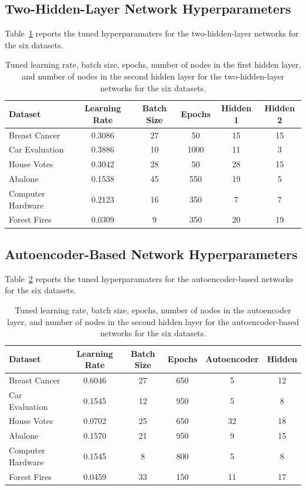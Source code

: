 \documentclass[twoside,11pt]{article}
\begin{document}
\subsection{Two-Hidden-Layer Network Hyperparameters}
Table~\ref{tab:hidden-tuning} reports the tuned hyperparamaters for the two-hidden-layer networks for the six datasets.

\begin{table}[h]
    \centering
    \begin{tabular}{lccccc}
    \hline
    Dataset & Learning Rate & Batch Size & Epochs & Hidden 1 & Hidden 2 \\
    \hline
    Breast Cancer      & 0.3086    & 27   & 50  & 15    & 15 \\
    Car Evaluation     & 0.3886   & 10 & 1000    & 11   & 3 \\
    House Votes        & 0.3042    & 28    & 50     & 28    & 15 \\
    Abalone            & 0.1538  & 45 & 550     & 19    & 5 \\
    Computer Hardware  & 0.2123   & 16  & 350   & 7     & 7 \\
    Forest Fires       & 0.0309   & 9  & 350    & 20    & 19 \\
    \hline
    \end{tabular}
    \caption{Tuned learning rate, batch size, epochs, number of nodes in the first hidden layer, and number of nodes in the second hidden layer for the two-hidden-layer networks for the six datasets.}
    \label{tab:hidden-tuning}
\end{table}

\subsection{Autoencoder-Based Network Hyperparameters}
Table~\ref{tab:autoencoder-tuning} reports the tuned hyperparamaters for the autoencoder-based networks for the six datasets.

\begin{table}[h]
    \centering
    \begin{tabular}{lccccc}
    \hline
    Dataset & Learning Rate & Batch Size & Epochs & Autoencoder & Hidden \\
    \hline
    Breast Cancer      & 0.6046    & 27   & 650  & 5    & 12 \\
    Car Evaluation     & 0.1545   & 12 & 950    & 5   & 8 \\
    House Votes        & 0.0702    & 25    & 650     & 32    & 18 \\
    Abalone            & 0.1570  & 21 & 950     & 9    & 15 \\
    Computer Hardware  & 0.1545   & 8  & 800   & 5     & 8 \\
    Forest Fires       & 0.0459   & 33  & 150    & 11    & 17 \\
    \hline
    \end{tabular}
    \caption{Tuned learning rate, batch size, epochs, number of nodes in the autoencoder layer, and number of nodes in the second hidden layer for the autoencoder-based networks for the six datasets.}
    \label{tab:autoencoder-tuning}
\end{table}
\end{document}
